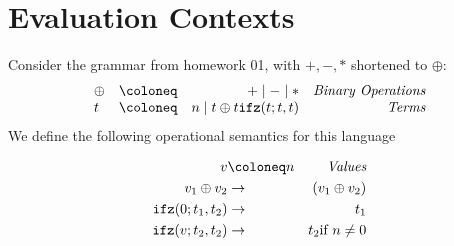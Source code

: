 \section*{Evaluation Contexts}
Consider the grammar from homework 01, with $+,-,*$ shortened to $\oplus$:
\[
  \begin{array}{l c r r}
    \oplus & \coloneq & + \mid - \mid * & \emph{Binary Operations}\\
    t & \coloneq & n \mid t \oplus t  \mathtt{ifz}(t;t,t) & \emph{Terms}\\
  \end{array}
\]
We define the following operational semantics for this language

\begin{align*}
  v & \coloneq n & \emph{Values}\\
  v_1 \oplus v_2 & \rightarrow & (v_1\oplus v_2)\\
  \mathtt{ifz}(0;t_1,t_2) & \rightarrow &  t_1\\
  \mathtt{ifz}(v;t_2,t_2) & \rightarrow & t_2 \text{if } n\neq 0\\
\end{align*}

\begin{minipage}{\textwidth}
  \begin{minipage}{0.3\textwidth}
    \begin{prooftree}
    \end{prooftree}
  \end{minipage}
  \hfill
  \begin{minipage}{0.3\textwidth}
    \begin{prooftree}
    \end{prooftree}
  \end{minipage}
  \hfill
  \begin{minipage}{0.3\textwidth}
    \begin{prooftree}
    \end{prooftree}
  \end{minipage}
  \hfill
  \vspace{2em}
\end{minipage}

